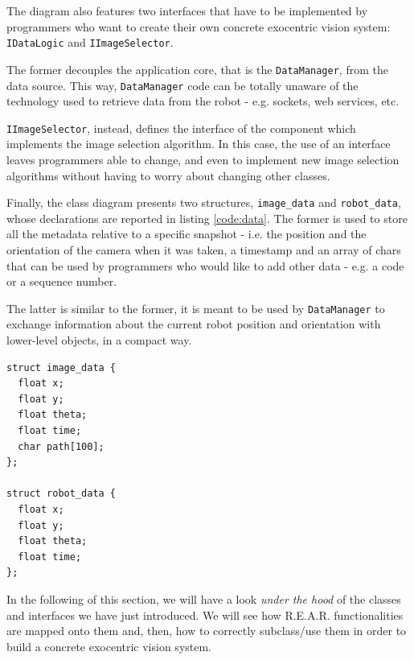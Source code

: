 %
The diagram also features two interfaces that have to be implemented 
by programmers who want to create their own concrete exocentric 
vision system: \texttt{IDataLogic} and 
\texttt{IImageSelector}.
%

%
The former decouples the application 
core, that is the \texttt{DataManager}, from the data source.
This way, \texttt{DataManager} code can be totally unaware of 
the technology used to retrieve data from the robot - e.g. 
sockets, web services, etc.
%

%
\texttt{IImageSelector}, instead, defines the interface 
of the component which implements the image selection algorithm.
%
In this case, the use of an interface leaves programmers 
able to change, and even to implement new image 
selection algorithms without having to worry about
changing other classes.
%

%
Finally, the class diagram presents two structures, 
\texttt{image\_data} and \texttt{robot\_data}, whose 
declarations are reported in listing \ref{code:data}.
%
The former is used to store all the metadata 
relative to a specific snapshot - i.e. the position 
and the orientation of the camera when it was taken, 
a timestamp and an array of chars that can be used by 
programmers who would like to add other data - e.g. 
a code or a sequence number.
%

%
The latter is similar to the former, it is meant to be 
used by \texttt{DataManager} to exchange information
about the current robot position and orientation with 
lower-level objects, in a compact way.
%
\begin{lstlisting}[caption={\textsf{R.E.A.R.} data structures}, label={code:data}, frame=trBL]
struct image_data {
  float x;
  float y;
  float theta;
  float time;
  char path[100];
};

struct robot_data {
  float x;
  float y;
  float theta;
  float time;
};
\end{lstlisting}
%

%
In the following of this section, we will have a look 
\textit{under the hood} of the classes and interfaces 
we have just introduced.
%
We will see how \textsf{R.E.A.R.} functionalities are 
mapped onto them and, then, how to correctly subclass/use
them in order to build a concrete exocentric vision system.
%

%
